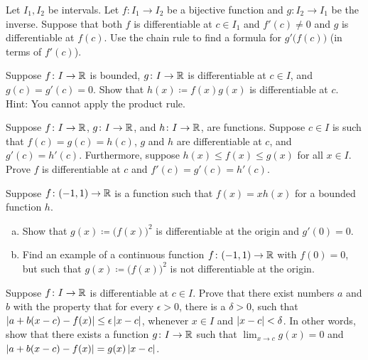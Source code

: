 \begin{exercise} \label{exercise:inversederformula}
Let $I_1, I_2$ be intervals.
Let $f \colon I_1 \to I_2$ be a bijective function and $g \colon I_2 \to I_1$
be the inverse.  Suppose that both $f$ is differentiable at $c \in I_1$ and
$f'(c) \not=0$ and $g$ is differentiable at $f(c)$.  Use the chain rule
to find a formula for $g'\bigl(f(c)\bigr)$ (in terms of $f'(c)$).
\end{exercise}

\begin{exercise} \label{exercise:bndmuldiff}
Suppose $f \colon I \to {\mathbb{R}}$ is bounded, $g \colon I \to
{\mathbb{R}}$ is differentiable at $c \in I$, and $g(c) = g'(c) = 0$.  Show
that $h(x) \coloneqq f(x) g(x)$ is differentiable at $c$.  Hint: You
cannot apply the product rule.
\end{exercise}

\begin{exercise} \label{exercise:diffsqueeze}
Suppose $f \colon I \to {\mathbb{R}}$, 
$g \colon I \to {\mathbb{R}}$, and
$h \colon I \to {\mathbb{R}}$, are functions.  Suppose $c \in I$ is such that
$f(c) = g(c) = h(c)$, $g$ and $h$ are differentiable at $c$,
and $g'(c) = h'(c)$.  Furthermore, suppose $h(x) \leq f(x) \leq g(x)$ for
all $x \in I$.  Prove $f$ is differentiable at $c$ and $f'(c) = g'(c) =
h'(c)$.
\end{exercise}

\begin{exercise}
Suppose $f \colon (-1,1) \to {\mathbb{R}}$ is a function such that $f(x) = x h(x)$ for a bounded
function $h$.
\begin{enumerate}[a)]
\item
Show that $g(x) \coloneqq {\bigl( f(x) \bigr)}^2$ is
differentiable at the origin and $g'(0) = 0$.
\item
Find an example of a
continuous function $f \colon (-1,1) \to {\mathbb{R}}$ with $f(0) = 0$, but such
that $g(x) \coloneqq {\bigl( f(x) \bigr)}^2$ is not differentiable at the origin.
\end{enumerate}
\end{exercise}

\begin{exercise}
Suppose $f \colon I \to {\mathbb{R}}$ is differentiable at $c \in I$.
Prove that there exist numbers $a$ and $b$ with the property that
for every $\epsilon > 0$, there is a $\delta > 0$, such that
$\left\lvert {a+b(x-c) - f(x)} \right\rvert \leq \epsilon \left\lvert {x-c} \right\rvert$, whenever $x \in I$ and
$\left\lvert {x-c} \right\rvert < \delta$.
In other words, show that
there exists a function $g \colon I \to {\mathbb{R}}$
such that $\lim_{x\to c} g(x) = 0$ and
$\left\lvert {a+b(x-c) - f(x)} \right\rvert = g(x) \left\lvert {x-c} \right\rvert$.
\end{exercise}

